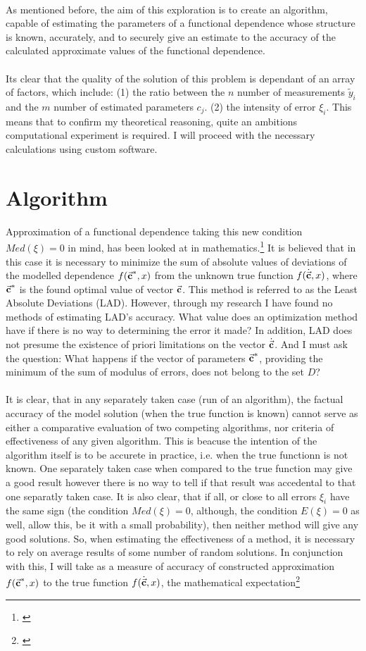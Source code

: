 \\
As mentioned before, the aim of this exploration is to create an algorithm, capable of estimating the parameters of a functional dependence whose structure is known, accurately,  and to securely give an estimate to the accuracy of the calculated approximate values of the functional dependence. \\
\\
Its clear that the quality of the solution of this problem is dependant of an array of factors, which include: (1) the ratio between the $n$ number of measurements $\tilde{y}_{i}$ and the $m$ number of estimated parameters $c_{j}$. (2) the intensity of error $\xi_{i}$. This means that to confirm my theoretical reasoning, quite an ambitions computational experiment is required. I will proceed with the necessary calculations using custom software. 

\section{Algorithm}

Approximation of a functional dependence taking this new condition $Med(\xi)=0$ in mind, has been looked at in mathematics.\footnote{\cite{balk_2010}} It is believed that in this case it is necessary to minimize the sum of absolute values of deviations of the modelled dependence $f(\vec{\textbf{c}}^{*},x)$ from the unknown true function $f(\dot{\vec{\textbf{c}}},x)$, where $\vec{\textbf{c}}^{*}$ is the found optimal value of  vector $\vec{\textbf{c}}$. This method is referred to as the Least Absolute Deviations (LAD). However, through my research I have found no methods of estimating LAD's accuracy. What value does an optimization method have if there is no way to determining the error it made? In addition, LAD does not presume the existence of priori limitations on the vector $\dot{\vec{\textbf{c}}}$. And I must ask the question: What happens if the vector of parameters $\vec{\textbf{c}}^{*}$, providing the minimum of the sum of modulus of errors, does not belong to the set $D$? \\
\\
It is clear, that in any separately taken case (run of an algorithm), the factual accuracy of the model solution (when the true function is known) cannot serve as either a comparative evaluation of two competing algorithms, nor criteria of effectiveness of any given algorithm. This is beacuse the intention of the algorithm itself is to be accurete in practice, i.e. when the true functionn is not known. One separately taken case when compared to the true function may give a good result however there is no way to tell if that result was accedental to that one separatly taken case. It is also clear, that if all, or close to all errors $\xi_{i}$ have the same sign (the condition $Med(\xi)=0$, although, the condition $E(\xi)=0$ as well, allow this, be it with a small probability), then neither method will give any good solutions. So, when estimating the effectiveness of a method, it is necessary to rely on average results of some number of random solutions. In conjunction with this, I will take as a measure of accuracy of constructed approximation $f(\vec{\textbf{c}}^{*},x)$ to the true function $f(\dot{\vec{\textbf{c}}},x)$, the mathematical expectation\footnote{\cite{Ross_2007}}

